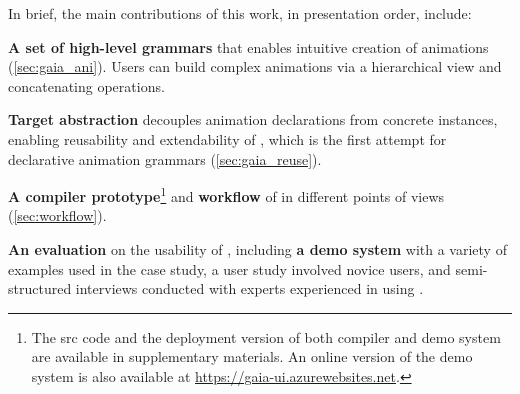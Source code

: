 In brief, the main contributions of this work, in presentation order, include:

\squishlist 
\item \textbf{A set of high-level grammars} that enables intuitive creation of animations (\autoref{sec:gaia_ani}). 
Users can build complex animations via a hierarchical view and concatenating operations. 
\item \textbf{Target abstraction} decouples animation declarations from concrete instances, enabling reusability and extendability of \gaia{}, which is the first attempt for declarative animation grammars (\autoref{sec:gaia_reuse}).
\item \textbf{A compiler prototype}\footnote{The src code and the deployment version of both \gaia{} compiler and demo system are available in supplementary materials. An online version of the demo system is also available at \url{https://gaia-ui.azurewebsites.net}.} and \textbf{workflow} of \gaia{} in different points of views (\autoref{sec:workflow}).
\item \textbf{An evaluation} on the usability of \gaia{}, including \textbf{a demo system} with a variety of examples used in the case study, a user study involved novice users, and semi-structured interviews conducted with experts experienced in using \gaia{}.
\squishend